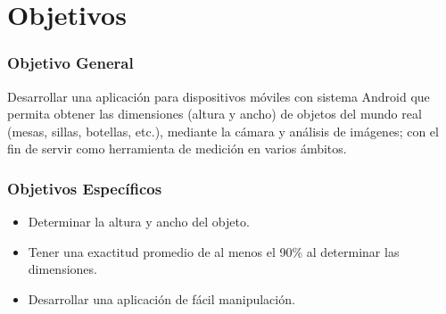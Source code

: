 \section{Objetivos}
\subsubsection{Objetivo General}

Desarrollar una aplicación para dispositivos móviles con sistema Android que permita obtener las dimensiones (altura y ancho) de objetos del mundo real (mesas, sillas, botellas, etc.), mediante la cámara y análisis de imágenes; con el fin de servir como herramienta de medición en varios ámbitos.

\subsubsection{Objetivos Específicos}
\begin{itemize}
	\item Determinar la altura y ancho del objeto.
	\item Tener una exactitud promedio de al menos el 90\% al determinar las dimensiones.
	\item Desarrollar una aplicación de fácil manipulación.
\end{itemize}